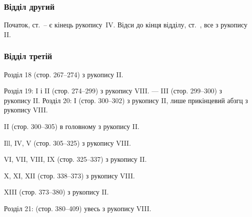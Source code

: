 \subsubsection*{Відділ другий}

Початок, ст.~\pageref{original-104}--\pageref{original-112} є кінець рукопису~IV.
Відси до кінця відділу, ст.~\pageref{original-266}, все з рукопису II.

\subsubsection*{Відділ третій}

Розділ 18 (стор. 267--274) з рукопису II.

Розділ 19: I і II (стор. 274--299) з рукопису VIII. — III (стор. 299--300)
з рукопису II.
Розділ 20: І (стор. 300--302) з рукопису II, лише прикінцевий
абзгц з рукопису VIII.

II (стор. 300--305) в головному з рукопису II.

Ill, IV, V (стор. 305--325) з рукопису VIII.

VI, VII, VIII, IX (стор. 325--337) з рукопису II.

X, XI, XII (стор. 338--373) з рукопису VIII.

XIII (стор. 373--380) з рукопису II.

Розділ 21: (стор. 380--409) увесь з рукопису VIII.
\parbreak{}  %
